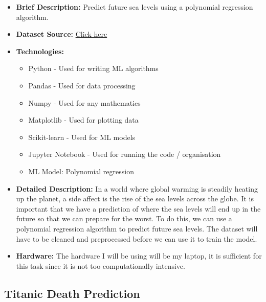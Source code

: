 \documentclass{article}
\begin{document}
\begin{itemize}
    \item \textbf{Brief Description:} Predict future sea levels using a polynomial regression algorithm.
    \item \textbf{Dataset Source:} \href{https://www.kaggle.com/datasets/kkhandekar/global-sea-level-1993-2021}{Click here} 
    \item \textbf{Technologies:}
    \begin{itemize}
        \item Python - Used for writing ML algorithms
        \item Pandas - Used for data processing
        \item Numpy - Used for any mathematics
        \item Matplotlib - Used for plotting data
        \item Scikit-learn - Used for ML models
        \item Jupyter Notebook - Used for running the code / organisation
        \item ML Model: Polynomial regression
    \end{itemize}
    \item \textbf{Detailed Description:} In a world where global warming is steadily heating up the planet, a side affect is the rise of the sea levels across the globe. 
    It is important that we have a prediction of where the sea levels will end up in the future so that we can prepare for the worst. To do this, we can use a polynomial 
    regression algorithm to predict future sea levels. The dataset will have to be cleaned and preprocessed before we can use it to train the model.
    \item \textbf{Hardware:} The hardware I will be using will be my laptop, it is sufficient for this task since it is not too computationally intensive. 
\end{itemize}

\subsection{Titanic Death Prediction}
\end{document}
